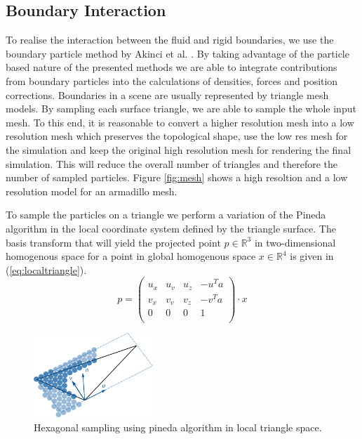 \documentclass[11pt, letterpaper, twocolumn]{article}
\begin{document}
\subsection{Boundary Interaction}
To realise the interaction between the fluid and rigid boundaries, we use the boundary particle method by Akinci et al. \cite{akinci2012}. By taking advantage of the particle based nature of the presented methods we are able to integrate contributions from boundary particles into the calculations of densities, forces and position corrections.
Boundaries in a scene are usually represented by triangle mesh models. By sampling each surface triangle, we are able to sample the whole input mesh.
To this end, it is reasonable to convert a higher resolution mesh into a low resolution mesh which preserves the topological shape, use the low res mesh for the simulation and keep the original high resolution mesh for rendering the final simulation. This will reduce the overall number of triangles and therefore the number of sampled particles. Figure \ref{fig:mesh} shows a high resoltion and a low resolution model for an armadillo mesh.

To sample the particles on a triangle we perform a variation of the Pineda algorithm \cite{pineda1988} in the local coordinate system defined by the triangle surface.
The basis transform that will yield the projected point \(p \in \mathbb{R}^3\) in two-dimensional homogenous space for a point in global homogenous space \(x \in \mathbb{R}^4\) is given in (\ref{eq:localtriangle}).
\begin{equation}
  p = 
  \begin{pmatrix}
    u_x & u_v & u_z & -u^T a\\
    v_x & v_v & v_z & -v^T a\\
    0 & 0 & 0 & 1 \\
  \end{pmatrix}
  \cdot x 
\label{eq:localtriangle}
\end{equation}

\begin{figure}[ht]
    \centering
    \includegraphics[width=0.4\textwidth]{images/triangle.pdf}
    \caption{Hexagonal sampling using pineda algorithm in local triangle space.}
    \label{fig:trianglesampling}
\end{figure}
\end{document}
